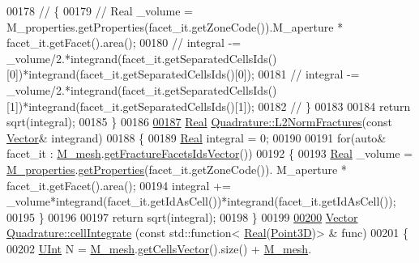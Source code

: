 \begin{DoxyCode}
00178 \textcolor{comment}{//    \{}
00179 \textcolor{comment}{//        Real \_volume = M\_properties.getProperties(facet\_it.getZoneCode()).M\_aperture *
       facet\_it.getFacet().area();}
00180 \textcolor{comment}{//        integral -=
       \_volume/2.*integrand(facet\_it.getSeparatedCellsIds()[0])*integrand(facet\_it.getSeparatedCellsIds()[0]);}
00181 \textcolor{comment}{//        integral -=
       \_volume/2.*integrand(facet\_it.getSeparatedCellsIds()[1])*integrand(facet\_it.getSeparatedCellsIds()[1]);}
00182 \textcolor{comment}{//    \}}
00183 
00184     \textcolor{keywordflow}{return} sqrt(integral);
00185 \}
00186 
\hypertarget{Quadrature_8cpp_source.tex_l00187}{}\hyperlink{classFVCode3D_1_1Quadrature_aa55d8f4b6158bf626695a786ab43be9d}{00187} \hyperlink{namespaceFVCode3D_a40c1f5588a248569d80aa5f867080e83}{Real} \hyperlink{classFVCode3D_1_1Quadrature_aa55d8f4b6158bf626695a786ab43be9d}{Quadrature::L2NormFractures}(\textcolor{keyword}{const} \hyperlink{namespaceFVCode3D_a16ccf345652402bccd1a5d2e6782526c}{Vector}& integrand)
00188 \{
00189     \hyperlink{namespaceFVCode3D_a40c1f5588a248569d80aa5f867080e83}{Real} integral = 0;
00190 
00191     \textcolor{keywordflow}{for}(\textcolor{keyword}{auto}& facet\_it : \hyperlink{classFVCode3D_1_1Quadrature_abaa2519ea32065df30242bd5f5cb2d01}{M\_mesh}.\hyperlink{classFVCode3D_1_1Rigid__Mesh_aadbe6d9ad704122537903396d91238e0}{getFractureFacetsIdsVector}())
00192     \{
00193         \hyperlink{namespaceFVCode3D_a40c1f5588a248569d80aa5f867080e83}{Real} \_volume = \hyperlink{classFVCode3D_1_1Quadrature_ace6cd23087209d3186ae173c265cde39}{M\_properties}.\hyperlink{classFVCode3D_1_1PropertiesMap_ace888d15c9a4ab13d5e217a3a565604c}{getProperties}(facet\_it.getZoneCode()).
      M\_aperture * facet\_it.getFacet().area();
00194         integral += \_volume*integrand(facet\_it.getIdAsCell())*integrand(facet\_it.getIdAsCell());
00195     \}
00196 
00197     \textcolor{keywordflow}{return} sqrt(integral);
00198 \}
00199 
\hypertarget{Quadrature_8cpp_source.tex_l00200}{}\hyperlink{classFVCode3D_1_1Quadrature_aed4aa5c10cdca072aae596813ed179b1}{00200} \hyperlink{namespaceFVCode3D_a16ccf345652402bccd1a5d2e6782526c}{Vector} \hyperlink{classFVCode3D_1_1Quadrature_aed4aa5c10cdca072aae596813ed179b1}{Quadrature::cellIntegrate} (\textcolor{keyword}{const} std::function<
      \hyperlink{namespaceFVCode3D_a40c1f5588a248569d80aa5f867080e83}{Real}(\hyperlink{classFVCode3D_1_1Point3D}{Point3D})> & func)
00201 \{
00202     \hyperlink{namespaceFVCode3D_a4bf7e328c75d0fd504050d040ebe9eda}{UInt} N = \hyperlink{classFVCode3D_1_1Quadrature_abaa2519ea32065df30242bd5f5cb2d01}{M\_mesh}.\hyperlink{classFVCode3D_1_1Rigid__Mesh_afefb62f2c37317402b495e2369ed495b}{getCellsVector}().size() + \hyperlink{classFVCode3D_1_1Quadrature_abaa2519ea32065df30242bd5f5cb2d01}{M\_mesh}.

\end{DoxyCode}

